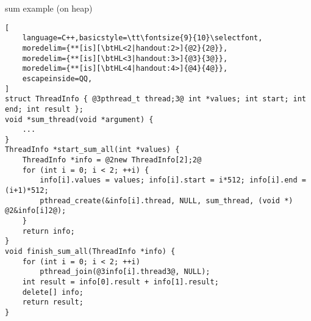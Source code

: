 \begin{frame}[fragile,label=sumAllHeap]{sum example (on heap)}
\begin{lstlisting}[
    language=C++,basicstyle=\tt\fontsize{9}{10}\selectfont,
    moredelim={**[is][\btHL<2|handout:2>]{@2}{2@}},
    moredelim={**[is][\btHL<3|handout:3>]{@3}{3@}},
    moredelim={**[is][\btHL<4|handout:4>]{@4}{4@}},
    escapeinside=QQ,
]
struct ThreadInfo { @3pthread_t thread;3@ int *values; int start; int end; int result };
void *sum_thread(void *argument) {
    ...
}
ThreadInfo *start_sum_all(int *values) {
    ThreadInfo *info = @2new ThreadInfo[2];2@
    for (int i = 0; i < 2; ++i) {
        info[i].values = values; info[i].start = i*512; info[i].end = (i+1)*512;
        pthread_create(&info[i].thread, NULL, sum_thread, (void *) @2&info[i]2@);
    }
    return info;
}
void finish_sum_all(ThreadInfo *info) {
    for (int i = 0; i < 2; ++i)
        pthread_join(@3info[i].thread3@, NULL);
    int result = info[0].result + info[1].result;
    delete[] info;
    return result;
}
\end{lstlisting}
\end{frame}

